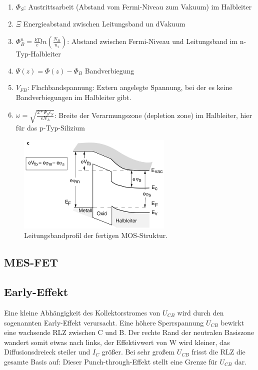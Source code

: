     \begin{enumerate}
        \item $\Phi_S$: Austrittsarbeit (Abstand vom Fermi-Niveau zum Vakuum) im Halbleiter
        \item $\Xi$ Energieabstand zwischen Leitungsband un dVakuum
        \item $\Phi_B^n = \frac{kT}{e}ln(\frac{N_D}{n_i})$: Abstand zwischen Fermi-Niveau und Leitungsband im n-Typ-Halbleiter
        \item $\Psi(z) = \Phi(z) - \Phi_B$ Bandverbiegung
        \item $V_{FB}$: Flachbandspannung: Extern angelegte Spannung, bei der es keine Bandverbiegungen im Halbleiter gibt. 
        \item $\omega = \sqrt{\frac{2*\Psi_S \epsilon_S}{eN_A}}$: Breite der Verarmungszone (depletion zone) im Halbleiter, hier für das p-Typ-Silizium
    \end{enumerate}
    
    \begin{figure}
        \centering
        \includegraphics[width=0.66\textwidth]{fig/mos-leitungsband.jpg}
        \caption{Leitungsbandprofil der fertigen MOS-Struktur.}
        \label{fig:mos-bänder}
    \end{figure}
    

\subsection{MES-FET }\label{k6:mesfet}

\subsection{Early-Effekt }\label{k6:early}
Eine kleine Abhängigkeit des Kollektorstromes von $U_{CB}$ wird durch den sogenannten
Early-Effekt verursacht. Eine höhere Sperrspannung $U_{CB}$ bewirkt eine wachsende RLZ
zwischen C und B. Der rechte Rand der neutralen Basiszone wandert somit etwas nach
links, der Effektivwert von W wird kleiner, das Diffusionsdreieck steiler und $I_C$ größer.
Bei sehr großem $U_{CB}$ frisst die RLZ die gesamte Basis auf: Dieser Punch-through-Effekt
stellt eine Grenze für $U_{CB}$ dar.

